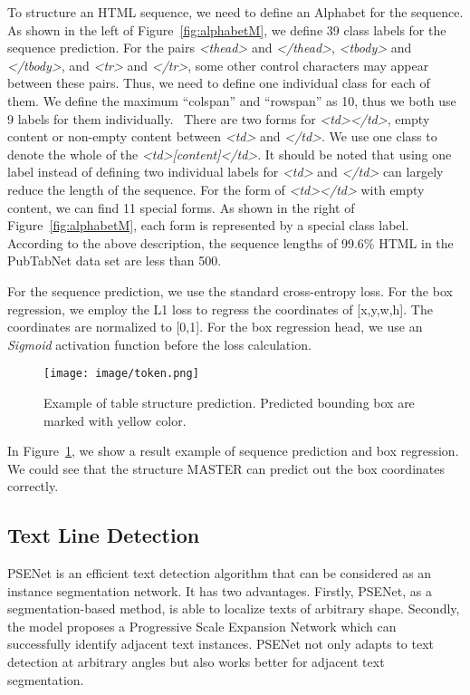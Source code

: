\documentclass{article}
\begin{document}
To structure an HTML sequence, we need to define an Alphabet for the sequence. As shown in the left of Figure~\ref{fig:alphabetM}, we define 39 class labels for the sequence prediction. For the pairs \emph{<thead>} and \emph{</thead>}, \emph{<tbody>} and \emph{</tbody>}, and \emph{<tr>} and \emph{</tr>}, some other control characters may appear between these pairs. Thus, we need to define one individual class for each of them.
We define the maximum ``colspan'' and ``rowspan'' as 10, thus we both use 9 labels for them individually.  There are two forms for \emph{<td></td>}, empty content or non-empty content between \emph{<td>} and \emph{</td>}. 
We use one class to denote the whole of the \emph{<td>[content]</td>}. It should be noted that using one label instead of defining two individual labels for \emph{<td>} and \emph{</td>} can largely reduce the length 
of the sequence.
For the form of \emph{<td></td>} with empty content, we can find 11 special forms. As shown in the right of Figure~\ref{fig:alphabetM}, each form is represented by a special class label. According to the above description, the sequence lengths of 99.6\% HTML in the PubTabNet data set are less than 500.








For the sequence prediction, we use the standard cross-entropy loss. For the box regression, we employ the L1 loss to regress the coordinates of [x,y,w,h]. The coordinates are normalized to [0,1]. For the box regression head, we use an \emph{Sigmoid} activation function before the loss calculation. 


\begin{figure}[h] \centering
    \texttt{[image: image/token.png]}
    \caption{Example of table structure prediction. Predicted bounding box are marked with yellow color.}
    \label{fig:structureMasterExample}
\end{figure}

In Figure~\ref{fig:structureMasterExample}, we show a result example of sequence prediction and box regression. We could see that the structure MASTER can predict out the box coordinates correctly.



\subsection{Text Line Detection}
PSENet is an efficient text detection algorithm that can be considered as an instance segmentation network. It has two advantages. Firstly, PSENet, as a segmentation-based method, is able to localize texts of arbitrary shape. Secondly, the model proposes a Progressive Scale Expansion Network which can successfully identify adjacent text instances. PSENet not only adapts to text detection at arbitrary angles but also works better for adjacent text segmentation.
\end{document}
